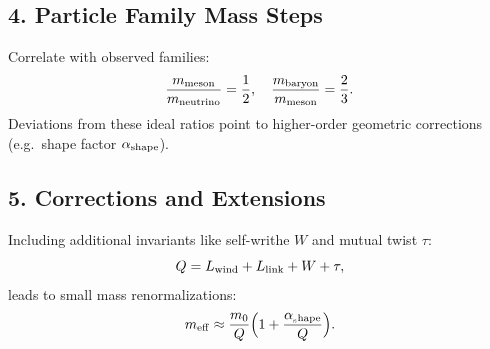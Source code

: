 \subsection*{4. Particle Family Mass Steps}
Correlate with observed families:
\[
\frac{m_{\rm meson}}{m_{\rm neutrino}}=\frac12,\quad
\frac{m_{\rm baryon}}{m_{\rm meson}}=\frac23.
\]
Deviations from these ideal ratios point to higher-order geometric corrections (e.g.\ shape factor \(\alpha_{\rm shape}\)).

\subsection*{5. Corrections and Extensions}
Including additional invariants like self-writhe \(W\) and mutual twist \(\tau\):
\[
Q = L_{\rm wind} + L_{\rm link} + W + \tau,
\]
leads to small mass renormalizations:
\[
m_{\rm eff}\approx \frac{m_0}{Q}\Bigl(1 + \frac{\alpha_{\rm_shape}}{Q}\Bigr).
\]


